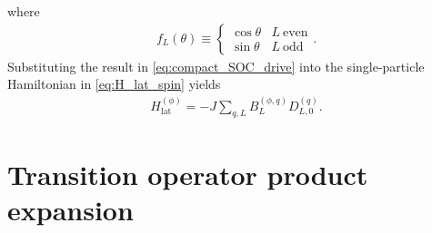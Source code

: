 \documentclass[nofootinbib,notitlepage,11pt]{revtex4-2}
\renewcommand{\t}{\text} %
\newcommand{\p}[1]{\left(#1\right)} %
\newcommand{\1}{\mathds{1}}
\begin{document}
where
\begin{align}
  f_L\p{\theta} \equiv
  \begin{cases}
    \cos\theta & L~\t{even} \\
    \sin\theta & L~\t{odd}
  \end{cases}.
\end{align}
Substituting the result in \eqref{eq:compact_SOC_drive} into the
single-particle Hamiltonian in \eqref{eq:H_lat_spin} yields
\begin{align}
  H_{\t{lat}}^{(\phi)} = -J \sum_{q,L} B_L^{(\phi,q)} D_{L,0}^{(q)}.
\end{align}

\section{Transition operator product expansion}
\label{sec:trans_prod}
\end{document}
